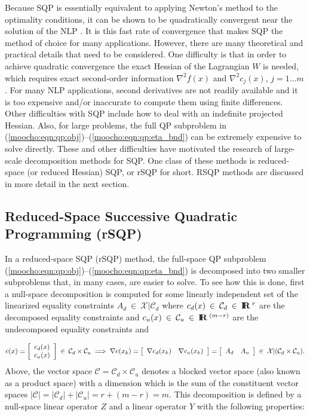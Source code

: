 \documentclass[pdf,12pt,report]{SANDreport}
\begin{document}
Because SQP is essentially equivalent to applying Newton's method to the
optimality conditions, it can be shown to be quadratically convergent near the
solution of the NLP {}\cite{ref:nocedal_overton_1985}.  It is this fast rate
of convergence that makes SQP the method of choice for many applications.
However, there are many theoretical and practical details that need to be
considered.  One difficulty is that in order to achieve quadratic convergence
the exact Hessian of the Lagrangian $W$ is needed, which requires exact
second-order information $\nabla^2 f(x)$ and $\nabla^2 c_j(x)$, $j = 1 \ldots
m$.  For many NLP applications, second derivatives are not readily available
and it is too expensive and/or inaccurate to compute them using finite
differences.  Other difficulties with SQP include how to deal with an
indefinite projected Hessian.  Also, for large problems, the full QP
subproblem in (\ref{moocho:eqn:qp:obj})--(\ref{moocho:eqn:qp:eta_bnd}) can be
extremely expensive to solve directly.  These and other difficulties have
motivated the research of large-scale decomposition methods for SQP.  One
class of these methods is reduced-space (or reduced Hessian) SQP, or rSQP for
short.  RSQP methods are discussed in more detail in the next section.

%
\subsection{Reduced-Space Successive Quadratic Programming (rSQP)}
\label{moocho:sec:rSQP}
%

In a reduced-space SQP (rSQP) method, the full-space QP subproblem
(\ref{moocho:eqn:qp:obj})--(\ref{moocho:eqn:qp:eta_bnd}) is decomposed into
two smaller subproblems that, in many cases, are easier to solve.  To see how
this is done, first a null-space decomposition {}\cite[Section
18.3]{ref:nocedal_wright_1999} is computed for some linearly independent set
of the linearized equality constraints $A_d \:\in\:\mathcal{X}|\mathcal{C}_d$
where $c_d(x)\:\in\:\mathcal{C}_d\:\in\:\mbox{\textbf{I}}\hspace{-0.6ex}\mbox{\textbf{R}}\:^{r}$ are the decomposed equality
constraints and $c_u(x)\:\in\:\mathcal{C}_u\:\in\:\mbox{\textbf{I}}\hspace{-0.6ex}\mbox{\textbf{R}}\:^{(m-r)}$ are the
undecomposed equality constraints and

{\bsinglespace
\begin{equation}
c(x) =
{\bmat{c} c_d(x) \\ c_u(x) \emat} \:\in\:\mathcal{C}_d \times \mathcal{C}_u
\; \Longrightarrow \;
\nabla c(x_k) = {\bmat{cc} \nabla c_d(x_k) & \nabla c_u(x_k) \emat}
= {\bmat{cc} A_d & A_u \emat} \:\in\:\mathcal{X}|(\mathcal{C}_d \times \mathcal{C}_u).
\label{moocho:eqn:lin_indep_constr}
\end{equation}
\esinglespace}
%
Above, the vector space $\mathcal{C} = \mathcal{C}_d \times \mathcal{C}_u$
denotes a blocked vector space (also known as a product space) with a
dimension which is the sum of the constituent vector spaces $|\mathcal{C}| =
|\mathcal{C}_d| + |\mathcal{C}_u| = r + (m - r) = m$.  This decomposition is
defined by a null-space linear operator $Z$ and a linear operator $Y$ with the following
properties:
\end{document}
